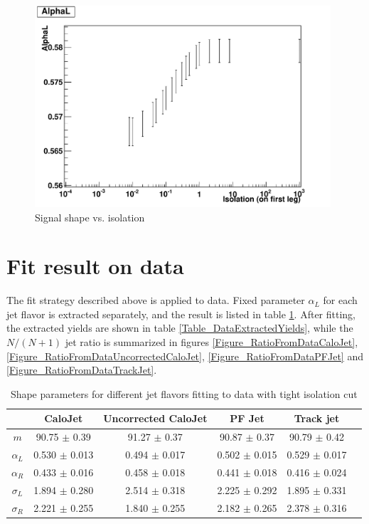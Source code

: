 \documentclass[10pt,a4paper,onecolumn]{article}
\begin{document}
\begin{figure}
\includegraphics[width=110mm]{AlphaLVsIsolation_ReasonableIsolation.pdf}
\caption{Signal shape vs. isolation}
\label{Figure_SignalShapeVsIsolation}
\end{figure}

\section{Fit result on data}

The fit strategy described above is applied to data.  Fixed parameter $\alpha_L$ for each jet flavor is extracted separately, and the result is listed in table \ref{Table_DataAlphaL}.
After fitting, the extracted yields are shown in table \ref{Table_DataExtractedYields}, while the $N/(N+1)$ jet ratio is summarized in figures \ref{Figure_RatioFromDataCaloJet},
\ref{Figure_RatioFromDataUncorrectedCaloJet}, \ref{Figure_RatioFromDataPFJet} and \ref{Figure_RatioFromDataTrackJet}.

\begin{table}
\caption{Shape parameters for different jet flavors fitting to data with tight isolation cut}
\centering
   \begin{tabular}{|c|c|c|c|c|c|}
      \hline
      & CaloJet & Uncorrected CaloJet & PF Jet & Track jet \\\hline
      $m$ & 90.75 $\pm$ 0.39 & 91.27 $\pm$ 0.37 & 90.87 $\pm$ 0.37 & 90.79 $\pm$ 0.42 \\\hline
      $\alpha_L$ & 0.530 $\pm$ 0.013 & 0.494 $\pm$ 0.017 & 0.502 $\pm$ 0.015 & 0.529 $\pm$ 0.017 \\\hline
      $\alpha_R$ & 0.433 $\pm$ 0.016 & 0.458 $\pm$ 0.018 & 0.441 $\pm$ 0.018 & 0.416 $\pm$ 0.024 \\\hline
      $\sigma_L$ & 1.894 $\pm$ 0.280 & 2.514 $\pm$ 0.318 & 2.225 $\pm$ 0.292 & 1.895 $\pm$ 0.331 \\\hline
      $\sigma_R$ & 2.221 $\pm$ 0.255 & 1.840 $\pm$ 0.255 & 2.182 $\pm$ 0.265 & 2.378 $\pm$ 0.316 \\\hline
   \end{tabular}
   \label{Table_DataAlphaL}
\end{table}
\end{document}
